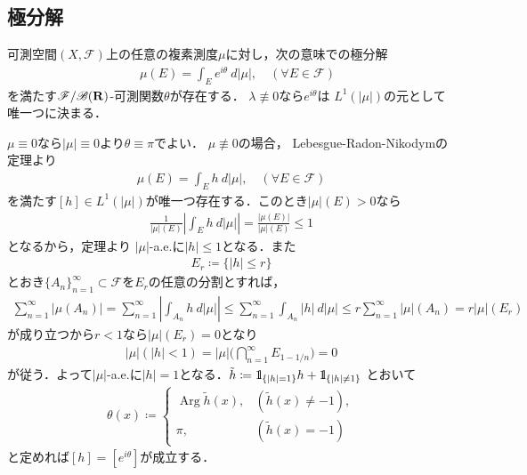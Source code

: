 \subsection{極分解}
	\begin{screen}
		\begin{thm}[複素測度の極分解]\label{thm:polar_decomposition_of_complex_measures}
			可測空間$(X,\mathscr{F})$上の任意の複素測度$\mu$に対し，次の意味での極分解
			\begin{align}
				\quad \mu(E) = \int_E e^{i\theta}\ d|\mu|,
				\quad (\forall E \in \mathscr{F})
			\end{align}
			を満たす$\mathscr{F}/\mathscr{B}(\mathbf{R})$-可測関数$\theta$が存在する．
			$\lambda \not\equiv 0$なら$e^{i \theta}$は
			$L^1(|\mu|)$の元として唯一つに決まる．
		\end{thm}
	\end{screen}
	
	\begin{prf} $\mu \equiv 0$なら$|\mu| \equiv 0$より$\theta \equiv \pi$でよい．
		$\mu \not\equiv 0$の場合，
		Lebesgue-Radon-Nikodymの定理より
		\begin{align}
			\mu(E) = \int_E h\ d|\mu|,
			\quad (\forall E \in \mathscr{F})
		\end{align}
		を満たす$[h] \in L^1(|\mu|)$が唯一つ存在する．このとき$|\mu|(E) > 0$なら
		\begin{align}
			\frac{1}{|\mu|(E)} \left| \int_E h\ d|\mu| \right|
			= \frac{|\mu(E)|}{|\mu|(E)} \leq 1
		\end{align}
		となるから，定理より
		$|\mu|$-a.e.に$|h| \leq 1$となる．また
		\begin{align}
			E_r \coloneqq \{|h| \leq r\}
		\end{align}
		とおき$\{A_n\}_{n=1}^\infty \subset \mathscr{F}$を$E_r$の任意の分割とすれば，
		\begin{align}
			\sum_{n=1}^\infty |\mu(A_n)|
			= \sum_{n=1}^\infty \left|\int_{A_n} h\ d|\mu|\right|
			\leq \sum_{n=1}^\infty \int_{A_n} |h|\ d|\mu|
			\leq r \sum_{n=1}^\infty |\mu|(A_n)
			= r |\mu|(E_r)
		\end{align}
		が成り立つから$r < 1$なら$|\mu|(E_r) = 0$となり
		\begin{align}
			|\mu|\left(|h|< 1 \right)
			= |\mu| \Biggl(\bigcap_{n=1}^\infty E_{1-1/n} \Biggr)
			= 0
		\end{align}
		が従う．よって$|\mu|$-a.e.に$|h|=1$となる．$\tilde{h} \coloneqq \mbox{1}\hspace{-0.25em}\mbox{l}_{\{|h|=1\}}h + \mbox{1}\hspace{-0.25em}\mbox{l}_{\{|h|\neq1\}}$
		とおいて
		\begin{align}
			\theta(x) \coloneqq
			\begin{cases}
				\operatorname{Arg} \tilde{h}(x), & (\tilde{h}(x) \neq -1), \\
				\pi, & (\tilde{h}(x) = -1)
			\end{cases}
		\end{align}
		と定めれば$[h] = [e^{i \theta}]$が成立する．
		\QED
	\end{prf}
	
